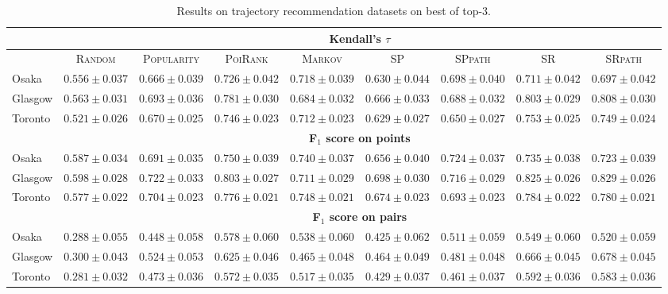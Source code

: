 \begin{table*}[!h]
\caption{Results on trajectory recommendation datasets on best of top-3.}
\centering
\scriptsize
\setlength{\tabcolsep}{3pt} %
\begin{tabular}{l|cc|ccc|ccc} \hline
& \multicolumn{8}{c}{\bf Kendall's $\tau$} \\ \hline
 & \textsc{Random} & \textsc{Popularity} & \textsc{PoiRank} & \textsc{Markov} & \textsc{SP} & \textsc{SPpath} & \textsc{SR} & \textsc{SRpath} \\ \hline
Osaka & $0.556\pm0.037$ & $0.666\pm0.039$ & $\mathbf{0.726\pm0.042}$ & $\mathit{0.718\pm0.039}$ & $0.630\pm0.044$ & $0.698\pm0.040$ & $0.711\pm0.042$ & $0.697\pm0.042$ \\
Glasgow & $0.563\pm0.031$ & $0.693\pm0.036$ & $0.781\pm0.030$ & $0.684\pm0.032$ & $0.666\pm0.033$ & $0.688\pm0.032$ & $\mathit{0.803\pm0.029}$ & $\mathbf{0.808\pm0.030}$ \\
Toronto & $0.521\pm0.026$ & $0.670\pm0.025$ & $0.746\pm0.023$ & $0.712\pm0.023$ & $0.629\pm0.027$ & $0.650\pm0.027$ & $\mathbf{0.753\pm0.025}$ & $\mathit{0.749\pm0.024}$ \\
\hline
& \multicolumn{8}{c}{\bf F$_1$ score on points} \\ \hline
Osaka & $0.587\pm0.034$ & $0.691\pm0.035$ & $\mathbf{0.750\pm0.039}$ & $\mathit{0.740\pm0.037}$ & $0.656\pm0.040$ & $0.724\pm0.037$ & $0.735\pm0.038$ & $0.723\pm0.039$ \\
Glasgow & $0.598\pm0.028$ & $0.722\pm0.033$ & $0.803\pm0.027$ & $0.711\pm0.029$ & $0.698\pm0.030$ & $0.716\pm0.029$ & $\mathit{0.825\pm0.026}$ & $\mathbf{0.829\pm0.026}$ \\
Toronto & $0.577\pm0.022$ & $0.704\pm0.023$ & $0.776\pm0.021$ & $0.748\pm0.021$ & $0.674\pm0.023$ & $0.693\pm0.023$ & $\mathbf{0.784\pm0.022}$ & $\mathit{0.780\pm0.021}$ \\
\hline
& \multicolumn{8}{c}{\bf F$_1$ score on pairs} \\ \hline
Osaka & $0.288\pm0.055$ & $0.448\pm0.058$ & $\mathbf{0.578\pm0.060}$ & $0.538\pm0.060$ & $0.425\pm0.062$ & $0.511\pm0.059$ & $\mathit{0.549\pm0.060}$ & $0.520\pm0.059$ \\
Glasgow & $0.300\pm0.043$ & $0.524\pm0.053$ & $0.625\pm0.046$ & $0.465\pm0.048$ & $0.464\pm0.049$ & $0.481\pm0.048$ & $\mathit{0.666\pm0.045}$ & $\mathbf{0.678\pm0.045}$ \\
Toronto & $0.281\pm0.032$ & $0.473\pm0.036$ & $0.572\pm0.035$ & $0.517\pm0.035$ & $0.429\pm0.037$ & $0.461\pm0.037$ & $\mathbf{0.592\pm0.036}$ & $\mathit{0.583\pm0.036}$ \\
\hline
\end{tabular}
\end{table*}


